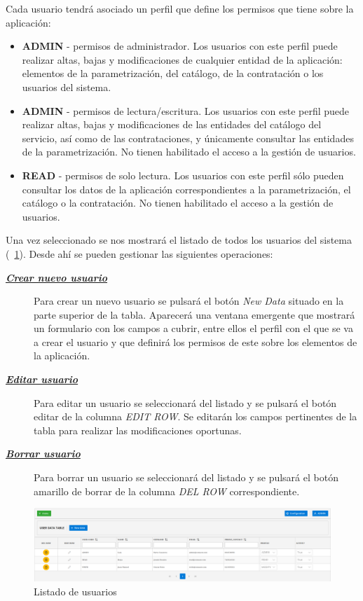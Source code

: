 Cada usuario tendrá asociado un perfil que define los permisos que tiene sobre la aplicación:
\begin{itemize}
\item \textbf{ADMIN} - permisos de administrador. Los usuarios con este perfil puede realizar altas, bajas y modificaciones de cualquier entidad de la aplicación: elementos de la parametrización, del catálogo, de la contratación o los usuarios del sistema.
\item \textbf{ADMIN} - permisos de lectura/escritura. Los usuarios con este perfil puede realizar altas, bajas y modificaciones de las entidades del catálogo del servicio, así como de las contrataciones, y únicamente consultar las entidades de la parametrización. No tienen habilitado el acceso a la gestión de usuarios.
\item \textbf{READ} - permisos de solo lectura. Los usuarios con este perfil sólo pueden consultar los datos de la aplicación correspondientes a la parametrización, el catálogo o la contratación. No tienen habilitado el acceso a la gestión de usuarios.
\end{itemize}


Una vez seleccionado se nos mostrará el listado de todos los usuarios del sistema (\figurename~\ref{fig:listado-usuarios}).
Desde ahí se pueden gestionar las siguientes operaciones:
\begin{description}
\item[\underline{\textsl{\textbf{Crear nuevo usuario}}}] Para crear un nuevo usuario se pulsará el botón \emph{New Data} situado en la parte superior de la tabla. Aparecerá una ventana emergente que mostrará un formulario con los campos a cubrir, entre ellos el perfil con el que se va a crear el usuario y que definirá los permisos de este sobre los elementos de la aplicación.

\item[\underline{\textsl{\textbf{Editar usuario}}}] Para editar un usuario se seleccionará del listado y se pulsará el botón editar de la columna \emph{EDIT ROW}. Se editarán los campos pertinentes de la tabla para realizar las modificaciones oportunas. 

\item[\underline{\textsl{\textbf{Borrar usuario}}}] Para borrar un usuario se seleccionará del listado y se pulsará el botón amarillo de borrar de la columna \emph{DEL ROW} correspondiente.
\end{description}


\begin{figure}[H]
  \centering
  \includegraphics[width=\textwidth]{imaxes/gestion-usuarios-02.png}
  \caption{Listado de usuarios}
  \label{fig:listado-usuarios}
\end{figure}



